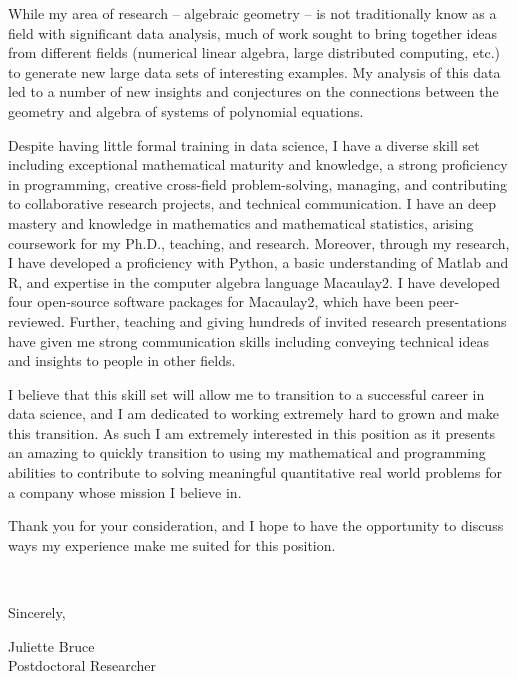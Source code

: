 \documentclass[11pt]{article}
\begin{document}
While my area of research -- algebraic geometry -- is not traditionally know as a field with significant data analysis, much of work sought to bring together ideas from different fields (numerical linear algebra, large distributed computing, etc.) to generate new large data sets of interesting examples. My analysis of this data led to a number of new insights and conjectures on the connections between the geometry and algebra of systems of polynomial equations. 

Despite having little formal training in data science, I have a diverse skill set including exceptional mathematical maturity and knowledge, a strong proficiency in programming, creative cross-field problem-solving, managing, and contributing to collaborative research projects, and technical communication. I have an deep mastery and knowledge in mathematics and mathematical statistics, arising coursework for my Ph.D., teaching, and research. Moreover, through my research, I have developed a proficiency with Python, a basic understanding of Matlab and R, and expertise in the computer algebra language Macaulay2. I have developed four open-source software packages for Macaulay2, which have been peer-reviewed. Further, teaching and giving hundreds of invited research presentations have given me strong communication skills including conveying technical ideas and insights to people in other fields.  


I believe that this skill set will allow me to transition to a successful career in data science, and I am dedicated to working extremely hard to grown and make this transition. As such I am extremely interested in this position as it presents an amazing to quickly transition to using my mathematical and programming abilities to contribute to solving meaningful quantitative real world problems for a company whose mission I believe in.

Thank you for your consideration, and I hope to have the opportunity to discuss ways my experience make me suited for this position.

\vspace{24pt}
\noindent
\begin{minipage}{0.99\textwidth}
\begin{minipage}{0.69\textwidth}
\textcolor{white}{.}
\end{minipage}
\begin{minipage}{0.29\textwidth}
Sincerely, 

\vspace{36pt}
Juliette Bruce\\
Postdoctoral Researcher\end{minipage}
\end{minipage}

\end{document}
